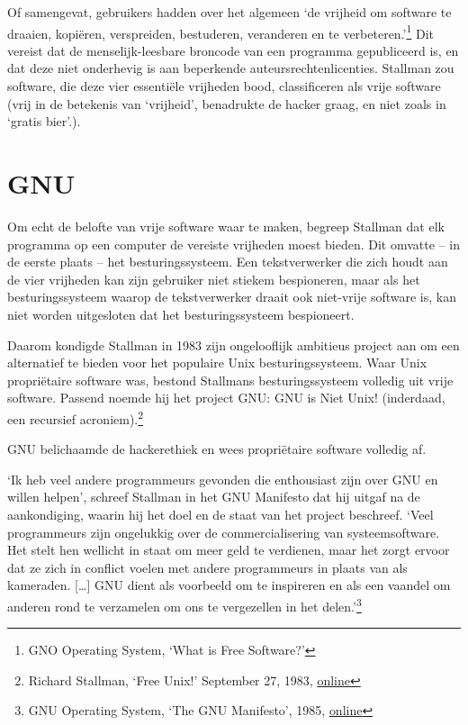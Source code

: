 \documentclass[smalldemyvopaper,11pt,twoside,onecolumn,openright,extrafontsizes,hidelinks]{memoir}
\begin{document}
Of samengevat, gebruikers hadden over het algemeen `de vrijheid om
software te draaien, kopiëren, verspreiden, bestuderen, veranderen en te
verbeteren.'\footnote{\hspace{0pt}GNO Operating System, `What is Free
  Software?'} Dit vereist dat de menselijk-leesbare broncode van een
programma gepubliceerd is, en dat deze niet onderhevig is aan beperkende
auteursrechtenlicenties. Stallman zou software, die deze vier essentiële
vrijheden bood, classificeren als vrije software (vrij in de betekenis
van `vrijheid', benadrukte de hacker graag, en niet zoals in `gratis
bier'.).

\section{GNU}\label{gnu}

Om echt de belofte van vrije software waar te maken, begreep Stallman
dat elk programma op een computer de vereiste vrijheden moest bieden.
Dit omvatte -- in de eerste plaats -- het besturingssysteem. Een
tekstverwerker die zich houdt aan de vier vrijheden kan zijn gebruiker
niet stiekem bespioneren, maar als het besturingssysteem waarop de
tekstverwerker draait ook niet-vrije software is, kan niet worden
uitgesloten dat het besturingssysteem bespioneert.

Daarom kondigde Stallman in 1983 zijn ongelooflijk ambitieus project aan
om een alternatief te bieden voor het populaire Unix besturingssysteem.
Waar Unix propriëtaire software was, bestond Stallmans besturingssysteem
volledig uit vrije software. Passend noemde hij het project GNU: GNU is
Niet Unix! (inderdaad, een recursief acroniem).\footnote{\hspace{0pt}Richard
  Stallman, `Free Unix!' September 27, 1983,
  \href{https://www.gnu.org/gnu/initial-announcement.en.html.}{online}}

GNU belichaamde de hackerethiek en wees propriëtaire software volledig
af.

`Ik heb veel andere programmeurs gevonden die enthousiast zijn over GNU
en willen helpen', schreef Stallman in het GNU Manifesto dat hij uitgaf
na de aankondiging, waarin hij het doel en de staat van het project
beschreef. `Veel programmeurs zijn ongelukkig over de commercialisering
van systeemsoftware. Het stelt hen wellicht in staat om meer geld te
verdienen, maar het zorgt ervoor dat ze zich in conflict voelen met
andere programmeurs in plaats van als kameraden. {[}\ldots{]} GNU dient
als voorbeeld om te inspireren en als een vaandel om anderen rond te
verzamelen om ons te vergezellen in het delen.'\footnote{\hspace{0pt}GNU
  Operating System, `The GNU Manifesto', 1985,
  \href{https://www.gnu.org/gnu/manifesto.html.en}{online}}
\end{document}
